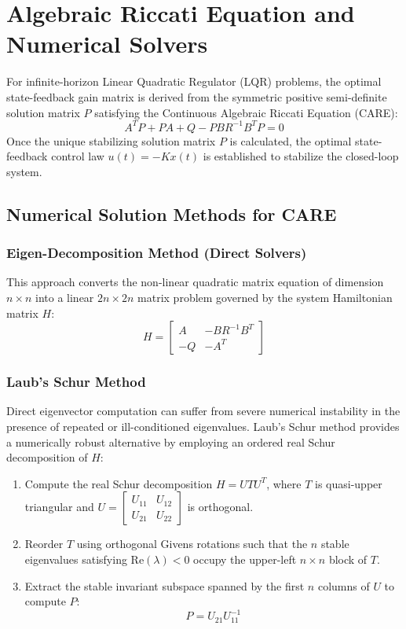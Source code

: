 \documentclass[11pt, a4paper]{article}
\begin{document}
\section{Algebraic Riccati Equation and Numerical Solvers}

For infinite-horizon Linear Quadratic Regulator (LQR) problems, the optimal state-feedback gain matrix is derived from the symmetric positive semi-definite solution matrix $P$ satisfying the Continuous Algebraic Riccati Equation (CARE):
\begin{equation}
A^T P + P A + Q - P B R^{-1} B^T P = 0
\end{equation}
Once the unique stabilizing solution matrix $P$ is calculated, the optimal state-feedback control law $u(t) = -K x(t)$ is established to stabilize the closed-loop system.

\subsection{Numerical Solution Methods for CARE}

\subsubsection{Eigen-Decomposition Method (Direct Solvers)}
This approach converts the non-linear quadratic matrix equation of dimension $n \times n$ into a linear $2n \times 2n$ matrix problem governed by the system Hamiltonian matrix $H$:
\begin{equation}
H = \begin{bmatrix} A & -B R^{-1} B^T \\ -Q & -A^T \end{bmatrix}
\end{equation}

\subsubsection{Laub's Schur Method}
Direct eigenvector computation can suffer from severe numerical instability in the presence of repeated or ill-conditioned eigenvalues. Laub's Schur method provides a numerically robust alternative by employing an ordered real Schur decomposition of $H$:
\begin{enumerate}
    \item Compute the real Schur decomposition $H = U T U^T$, where $T$ is quasi-upper triangular and $U = \begin{bmatrix} U_{11} & U_{12} \\ U_{21} & U_{22} \end{bmatrix}$ is orthogonal.
    \item Reorder $T$ using orthogonal Givens rotations such that the $n$ stable eigenvalues satisfying $\text{Re}(\lambda) < 0$ occupy the upper-left $n \times n$ block of $T$.
    \item Extract the stable invariant subspace spanned by the first $n$ columns of $U$ to compute $P$:
    \begin{equation}
    P = U_{21} U_{11}^{-1}
    \end{equation}
\end{enumerate}
\end{document}
